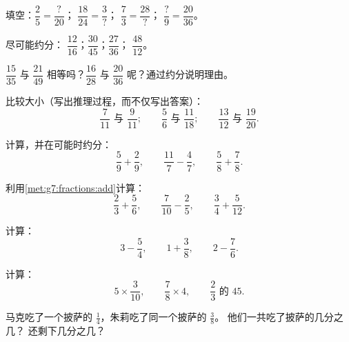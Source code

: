 \begin{exercise}[$\star$]\label{exo:g7:fractions:1}
填空：$\dfrac{2}{5} = \dfrac{?}{20}$；\quad
$\dfrac{18}{24} = \dfrac{3}{?}$；\quad
$\dfrac{7}{3} = \dfrac{28}{?}$；\quad
$\dfrac{?}{9} = \dfrac{20}{36}$。
\end{exercise}

\begin{exercise}[$\star$]\label{exo:g7:fractions:2}
尽可能约分：
$\dfrac{12}{16}$；\quad $\dfrac{30}{45}$；\quad $\dfrac{27}{36}$；
\quad $\dfrac{48}{12}$。
\end{exercise}

\begin{exercise}[$\star$]\label{exo:g7:fractions:3}
$\dfrac{15}{35}$ 与 $\dfrac{21}{49}$ 相等吗？$\dfrac{16}{28}$
与 $\dfrac{20}{36}$ 呢？通过约分说明理由。
\end{exercise}

\begin{exercise}[$\star$]\label{exo:g7:fractions:4}
比较大小（写出推理过程，而不仅写出答案）：
\[
\frac{7}{11} \text{ 与 } \frac{9}{11}; \qquad
\frac{5}{6} \text{ 与 } \frac{11}{18}; \qquad
\frac{13}{12} \text{ 与 } \frac{19}{20}.
\]
\end{exercise}

\begin{exercise}[$\star$]\label{exo:g7:fractions:5}
计算，并在可能时约分：
\[
\frac{5}{9} + \frac{2}{9}, \qquad
\frac{11}{7} - \frac{4}{7}, \qquad
\frac{5}{8} + \frac{7}{8} .
\]
\end{exercise}

\begin{exercise}[$\star$]\label{exo:g7:fractions:6}
利用\cref{met:g7:fractions:add}计算：
\[
\frac{2}{3} + \frac{5}{6}, \qquad
\frac{7}{10} - \frac{2}{5}, \qquad
\frac{3}{4} + \frac{5}{12} .
\]
\end{exercise}

\begin{exercise}[$\star$]\label{exo:g7:fractions:7}
计算：
\[
3 - \frac{5}{4}, \qquad
1 + \frac{3}{8}, \qquad
2 - \frac{7}{6} .
\]
\end{exercise}

\begin{exercise}[$\star$]\label{exo:g7:fractions:8}
计算：
\[
5 \times \frac{3}{10}, \qquad
\frac{7}{8} \times 4, \qquad
\frac{2}{3} \text{ 的 } 45 .
\]
\end{exercise}

\begin{exercise}[$\star\star$]\label{exo:g7:fractions:9}
马克吃了一个披萨的 $\frac14$，朱莉吃了同一个披萨的 $\frac38$。
他们一共吃了披萨的几分之几？
还剩下几分之几？
\end{exercise}

